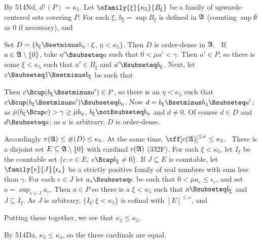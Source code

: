 {\medskip

 By 514Nd, $d^{\uparrow}(P)=\kappa_5$.   Let
$\ofamily{\xi}{\kappa_5}{B_{\xi}}$ be a family of
upwards-centered sets covering $P$.   For each $\xi$,
$b_{\xi}=\sup B_{\xi}$ is defined in $\frak A$ (counting $\sup\emptyset$
as $0$ if necessary), and


\noindent
Set $D=\{b_{\xi}\Bsetminus b_{\eta}:\xi$, $\eta<\kappa_5\}$.   Then $D$
is order-dense in $\frak A$.   \Prf\ If $a\in\frak A\setminus\{0\}$,
take $a'\Bsubseteq a$ such that
$0<\bar\mu a'<\gamma$.   Then $a'\in P$, so there is some $\xi<\kappa_5$
such that $a'\in B_{\xi}$ and
$a'\Bsubseteq b_{\xi}$.   Next, let $c\Bsubseteq 1\Bsetminus b_{\xi}$ be
such that


\noindent Then $c\Bcup(b_{\xi}\Bsetminus a')\in P$, so there is an
$\eta<\kappa_5$ such that
$c\Bcup(b_{\xi}\Bsetminus a')\Bsubseteq b_{\eta}$.   Now
$d=b_{\xi}\Bsetminus b_{\eta}\Bsubseteq a'$;  as
$\bar\mu(b_{\xi}\Bcup c)>\gamma\ge\bar\mu b_{\eta}$,
$b_{\xi}\notBsubseteq b_{\eta}$ and $d\ne 0$.   Of course $d\in D$ and
$d\Bsubseteq a$;  as $a$ is arbitrary, $D$ is order-dense.\ \Qed

Accordingly $\pi(\frak A)\le\#(D)\le\kappa_5$.   At the same time,
$\cff[c(\frak A)]^{\le\omega}\le\kappa_5$.  \Prf\ There is a disjoint set
$E\subseteq\frak A\setminus\{0\}$ with cardinal $c(\frak A)$ (332F).   For
each $\xi<\kappa_5$, let $I_{\xi}$ be the countable set
$\{e:e\in E$, $e\Bcap b_{\xi}\ne 0\}$.
If $J\subseteq E$ is countable, let $\family{e}{J}{\epsilon_e}$ be a
strictly positive family of real numbers with sum less than $\gamma$.
For each $e\in J$ let $a_e\Bsubseteq e$ be such that
$0<\bar\mu a_e\le\epsilon_e$, and set $a=\sup_{e\in J}a_e$.   Then $a\in
P$ so there is a $\xi<\kappa_5$ such that $a\Bsubseteq b_{\xi}$ and
$J\subseteq I_{\xi}$.   As $J$ is arbitrary, $\{I_{\xi}:\xi<\kappa_5\}$
is cofinal with $[E]^{\le\omega}$, and


Putting these together, we see that $\kappa_3\le\kappa_5$.

\medskip

 By 514Da, $\kappa_5\le\kappa_4$, so the three cardinals
are equal.
}%

